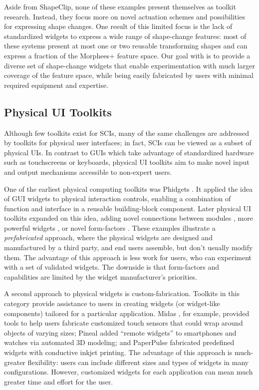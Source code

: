       Aside from ShapeClip, none of these examples present themselves as toolkit
      research. Instead, they focus more on novel actuation schemes and
      possibilities for expressing shape changes. One result of this limited
      focus is the lack of standardized widgets to express a wide range of
      shape-change features: most of these systems present at most one or two
      reusable transforming shapes and can express a fraction of the Morphees+
      \cite{10.1145/3173574.3174193} feature space. Our goal with \mp is to
      provide a diverse set of shape-change widgets that enable experimentation
      with much larger coverage of the feature space, while being easily
      fabricated by users with minimal required equipment and expertise.
        
    \subsection{Physical UI Toolkits}
      Although few toolkits exist for SCIs, many of the same challenges are
      addressed by toolkits for physical user interfaces; in fact, SCIs can be
      viewed as a subset of physical UIs. In contrast to GUIs which take
      advantage of standardized hardware such as touchscreens or keyboards,
      physical UI toolkits aim to make novel input and output mechanisms
      accessible to non-expert users.
      
      One of the earliest physical computing toolkits was Phidgets
      \cite{Greenberg:2001}. It applied the idea of GUI widgets to physical
      interaction controls, enabling a combination of function and interface in
      a reusable building-block component. Later physical UI toolkits expanded
      on this idea, adding novel connections between modules
      \cite{Bdeir:2009kz}, more powerful widgets \cite{Villar:2012}, or novel
      form-factors \cite{Hodges:2014}. These examples illustrate a
      \textit{prefabricated} approach, where the physical widgets are designed
      and manufactured by a third party, and end users assemble, but don't
      usually modify them. The advantage of this approach is less work for
      users, who can experiment with a set of validated widgets. The downside is
      that form-factors and capabilities are limited by the widget
      manufacturer's priorities.
      
      A second approach to physical widgets is custom-fabrication. Toolkits in
      this category provide assistance to users in creating widgets (or
      widget-like components) tailored for a particular application. Midas
      \cite{Savage:2012}, for example, provided tools to help users fabricate
      customized touch sensors that could wrap around objects of varying sizes;
      Pineal \cite{Ledo:2017} added ``remote widgets'' to smartphones and
      watches via automated 3D modeling; and PaperPulse \cite{Ramakers:2015}
      fabricated predefined widgets with conductive inkjet printing. The
      advantage of this approach is much-greater flexibility: users can include
      different sizes and types of widgets in many configurations. However,
      customized widgets for each application can mean much greater time and
      effort for the user.
      
